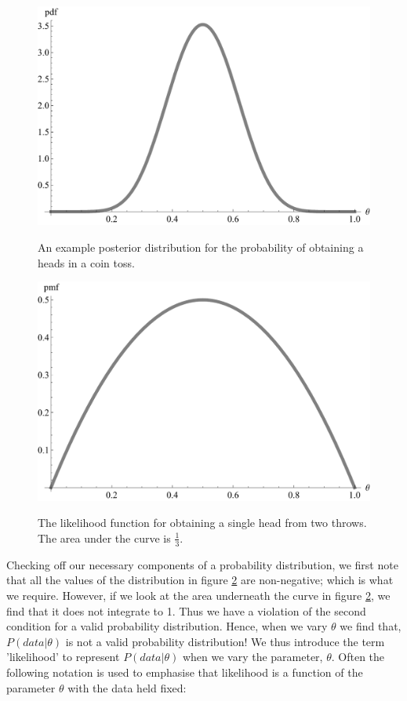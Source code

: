 \documentclass[11pt,fullpage]{book}
\begin{document}
\begin{figure}
\centering
\scalebox{0.5} 
{\includegraphics{Likelihood_posteriorExample.pdf}}
\caption{An example posterior distribution for the probability of obtaining a heads in a coin toss.}\label{fig:Likelihood_posteriorExample}
\end{figure}

\begin{figure}
\centering
\scalebox{0.5} 
{\includegraphics{Likelihood_coinLikelihood.pdf}}
\caption{The likelihood function for obtaining a single head from two throws. The area under the curve is $\frac{1}{3}$.}\label{fig:Likelihood_coinLikelihood}
\end{figure}

Checking off our necessary components of a probability distribution, we first note that all the values of the distribution in figure \ref{fig:Likelihood_coinLikelihood} are non-negative; which is what we require. However, if we look at the area underneath the curve in figure \ref{fig:Likelihood_coinLikelihood}, we find that it does not integrate to 1. Thus we have a violation of the second condition for a valid probability distribution. Hence, when we vary $\theta$ we find that, $P(data|\theta)$ is not a valid probability distribution! We thus introduce the term 'likelihood' to represent $P(data|\theta)$ when we vary the parameter, $\theta$. Often the following notation is used to emphasise that likelihood is a function of the parameter $\theta$ with the data held fixed:
\end{document}
